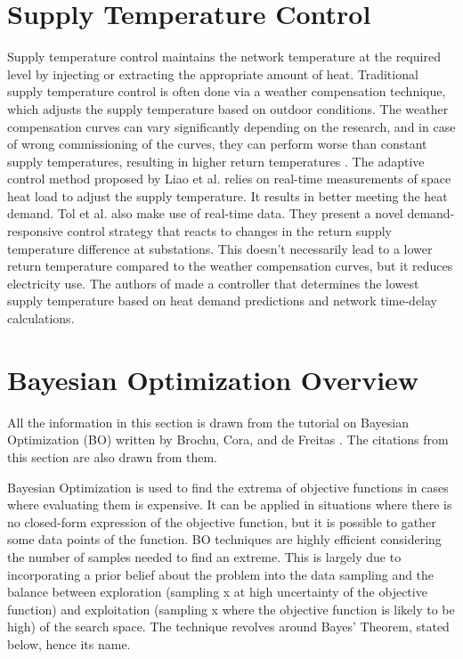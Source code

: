 \section{Supply Temperature Control}
Supply temperature control maintains the network temperature at the required level by injecting or extracting the appropriate amount of heat. Traditional supply temperature control is often done via a weather compensation technique, which adjusts the supply temperature based on outdoor conditions. The weather compensation curves can vary significantly depending on the research, and in case of wrong commissioning of the curves, they can perform worse than constant supply temperatures, resulting in higher return temperatures \cite{app15062982, LIAO200555}. The adaptive control method proposed by Liao et al. \cite{LIAO200555} relies on real-time measurements of space heat load to adjust the supply temperature. It results in better meeting the heat demand. Tol et al. \cite{TOL2021105} also make use of real-time data. They present a novel demand-responsive control strategy that reacts to changes in the return supply temperature difference at substations. This doesn't necessarily lead to a lower return temperature compared to the weather compensation curves, but it reduces electricity use. The authors of \cite{papaKonstantikou} made a controller that determines the lowest supply temperature based on heat demand predictions and network time-delay calculations. 


\section{Bayesian Optimization Overview}
All the information in this section is drawn from the tutorial on Bayesian Optimization (BO) written by Brochu, Cora, and de Freitas \cite{bo_tutorial}. The citations from this section are also drawn from them. 

Bayesian Optimization is used to find the extrema of objective functions in cases where evaluating them is expensive. It can be applied in situations where there is no closed-form expression of the objective function, but it is possible to gather some data points of the function. BO techniques are highly efficient considering the number of samples needed to find an extreme. This is largely due to incorporating a prior belief about the problem into the data sampling and the balance between exploration (sampling x at high uncertainty of the objective function) and exploitation (sampling x where the objective function is likely to be high) of the search space. The technique revolves around Bayes' Theorem, stated below, hence its name. 

